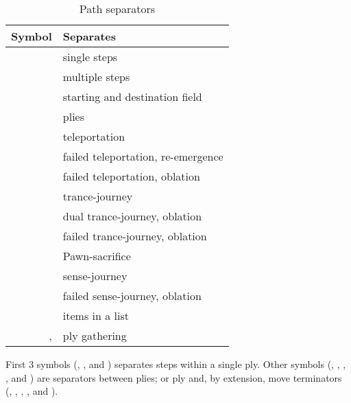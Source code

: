 \begin{table}[!h]
\centering
\begin{tabular}{ rl }
\toprule %
\textbf{Symbol}      & \textbf{Separates}                         \\
\midrule %
\alg{.}              & single steps                               \\
\alg{..}             & multiple steps                             \\
\alg{-}              & starting and destination field             \\
\cmidrule{1-2} %
\alg{\~{}}           & plies                                      \\
\alg{|}              & teleportation                              \\
\alg{||}             & failed teleportation, re-emergence         \\
\alg{|||}            & failed teleportation, oblation             \\
\alg{@}              & trance-journey                             \\
\alg{@@}             & dual trance-journey, oblation              \\
\alg{@@@}            & failed trance-journey, oblation            \\
\alg{;;}             & Pawn-sacrifice                             \\
\alg{"}              & sense-journey                              \\
\alg{'}              & failed sense-journey, oblation             \\
\cmidrule{1-2} %
\alg{,}              & items in a list                            \\
\alg{[}, \alg{]}     & ply gathering                              \\
\bottomrule %
\end{tabular}
\caption{Path separators}
\label{tbl:Appendix/Summary/Path separators}
\end{table}

First 3 symbols (, , and \alg{-}) separates steps within a single ply.
Other symbols (\alg{\~{}}, \alg{|}, , \alg{;;}, and ) are separators
between plies; or ply and, by extension, move terminators (\alg{||}, \alg{|||}, ,
, and ).

